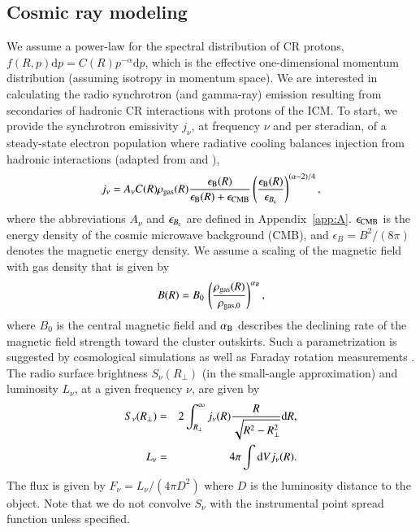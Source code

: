 \documentclass[useAMS,usenatbib]{mn2e}
\newcommand{\dd}{\mathrm{d}}
\begin{document}
\subsection{Cosmic ray modeling}
\label{sec:2.3}
We assume a power-law for the spectral distribution of CR protons, $f(R,p) \dd
p=C(R) p^{-\alpha} \dd p$, which is the effective one-dimensional momentum
distribution (assuming isotropy in momentum space). We are interested in
calculating the radio synchrotron (and gamma-ray) emission resulting from
secondaries of hadronic CR interactions with protons of the ICM. To start, we
provide the synchrotron emissivity $j_{\nu}$, at frequency $\nu$ and per
steradian, of a steady-state electron population where radiative cooling
balances injection from hadronic interactions (adapted from
\citealp{2008MNRAS.385.1211P} and \citealp{2011A&A...527A..99E}),
\begin{equation}
j_{\nu}  =  A_\nu C(R) \rho_{{\mathrm{gas}}}(R) 
\frac{\epsilon_{{\mathrm{B}}}(R)}{\epsilon_{{\mathrm{B}}}(R)+\epsilon_{{\mathrm{CMB}}}} 
\left( \frac{\epsilon_{{\mathrm{B}}}(R)}{\epsilon_{B_{{\mathrm{c}}}}} \right)^{(\alpha-2)/4},
\label{eq:jnu}
\end{equation}
where the abbreviations $A_\nu$ and $\epsilon_{B_{{\mathrm{c}}}}$ are defined in
Appendix~\ref{app:A}. $\epsilon_{{\mathrm{CMB}}}$ is the energy density of the cosmic
microwave background (CMB), and $\epsilon_B=B^{2}/(8\pi)$ denotes the magnetic
energy density. We assume a scaling of the magnetic field with gas density that
is given by
\begin{equation}
B(R) = B_0\,\left(\frac{\rho_{{\mathrm{gas}}}(R)}{\rho_{{\mathrm{gas}},0}}\right)^{\alpha_B},
\label{eq:B}
\end{equation}
where $B_0$ is the central magnetic field and $\alpha_{{\mathrm{B}}}$ describes the
declining rate of the magnetic field strength toward the cluster outskirts. Such
a parametrization is suggested by cosmological simulations
\citep{2008A&A...482L..13D} as well as Faraday rotation measurements \citep[][and
references therein]{2010A&A...513A..30B, 2011A&A...529A..13K}.  The radio
surface brightness $S_{\nu}(R_{\perp})$ (in the small-angle approximation) and
luminosity $L_{\nu}$, at a given frequency $\nu$, are given by
\begin{eqnarray}
S_\nu(R_{\perp}) &=& 2 \int_{R_{\perp}}^{\infty} j_{\nu}(R) \frac{R}{\sqrt{R^{2}-R_{\perp}^{2}}} \rmn{d}R, \label{eq:surf} \\
L_{\nu}  &=&  4 \pi \int \dd V j_\nu(R).
\label{eq:lum}
\end{eqnarray}
The flux is given by $F_{\nu}=L_{\nu}/(4\pi D^{2})$ where $D$ is the luminosity
distance to the object. Note that we do not convolve $S_\nu$ with the instrumental
point spread function unless specified.
\end{document}
